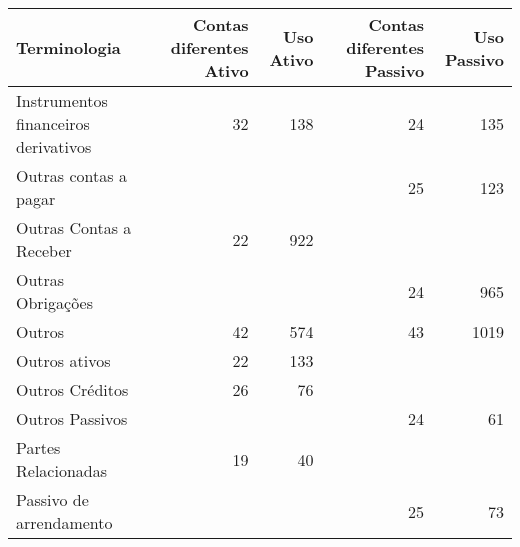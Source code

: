 \begin{table}[ht]
\centering
\begin{tabular}{lrrrr}
  \hline
Terminologia & Contas diferentes Ativo & Uso Ativo & Contas diferentes Passivo & Uso Passivo \\ 
  \hline
Instrumentos financeiros derivativos &  32 & 138 &  24 & 135 \\ 
  Outras contas a pagar &  &  &  25 & 123 \\ 
  Outras Contas a Receber &  22 & 922 &  &  \\ 
  Outras Obrigações &  &  &  24 & 965 \\ 
  Outros &  42 & 574 &  43 & 1019 \\ 
  Outros ativos &  22 & 133 &  &  \\ 
  Outros Créditos &  26 &  76 &  &  \\ 
  Outros Passivos &  &  &  24 &  61 \\ 
  Partes Relacionadas &  19 &  40 &  &  \\ 
  Passivo de arrendamento &  &  &  25 &  73 \\ 
   \hline
\end{tabular}
\end{table}
